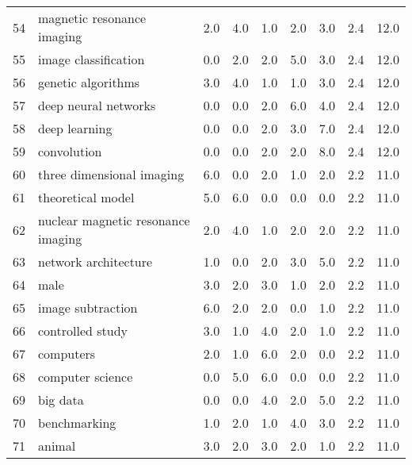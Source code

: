 \begin{tabular}{llrrrrrrr}
54 &               magnetic resonance imaging &   2.0 &   4.0 &   1.0 &   2.0 &   3.0 &   2.4 &   12.0 \\
55 &                     image classification &   0.0 &   2.0 &   2.0 &   5.0 &   3.0 &   2.4 &   12.0 \\
56 &                       genetic algorithms &   3.0 &   4.0 &   1.0 &   1.0 &   3.0 &   2.4 &   12.0 \\
57 &                     deep neural networks &   0.0 &   0.0 &   2.0 &   6.0 &   4.0 &   2.4 &   12.0 \\
58 &                            deep learning &   0.0 &   0.0 &   2.0 &   3.0 &   7.0 &   2.4 &   12.0 \\
59 &                              convolution &   0.0 &   0.0 &   2.0 &   2.0 &   8.0 &   2.4 &   12.0 \\
60 &                three dimensional imaging &   6.0 &   0.0 &   2.0 &   1.0 &   2.0 &   2.2 &   11.0 \\
61 &                        theoretical model &   5.0 &   6.0 &   0.0 &   0.0 &   0.0 &   2.2 &   11.0 \\
62 &       nuclear magnetic resonance imaging &   2.0 &   4.0 &   1.0 &   2.0 &   2.0 &   2.2 &   11.0 \\
63 &                     network architecture &   1.0 &   0.0 &   2.0 &   3.0 &   5.0 &   2.2 &   11.0 \\
64 &                                     male &   3.0 &   2.0 &   3.0 &   1.0 &   2.0 &   2.2 &   11.0 \\
65 &                        image subtraction &   6.0 &   2.0 &   2.0 &   0.0 &   1.0 &   2.2 &   11.0 \\
66 &                         controlled study &   3.0 &   1.0 &   4.0 &   2.0 &   1.0 &   2.2 &   11.0 \\
67 &                                computers &   2.0 &   1.0 &   6.0 &   2.0 &   0.0 &   2.2 &   11.0 \\
68 &                         computer science &   0.0 &   5.0 &   6.0 &   0.0 &   0.0 &   2.2 &   11.0 \\
69 &                                 big data &   0.0 &   0.0 &   4.0 &   2.0 &   5.0 &   2.2 &   11.0 \\
70 &                             benchmarking &   1.0 &   2.0 &   1.0 &   4.0 &   3.0 &   2.2 &   11.0 \\
71 &                                   animal &   3.0 &   2.0 &   3.0 &   2.0 &   1.0 &   2.2 &   11.0 \\

\end{tabular}

